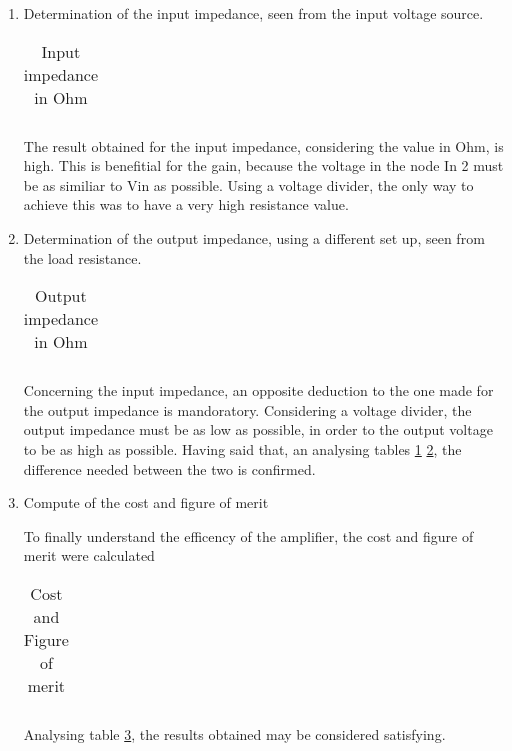 \begin{enumerate}
\begin{figure}[ht]
\begin{subfigure}{.5\textwidth}
\end{subfigure}
\end{figure}



\item Determination of the input impedance, seen from the input voltage source.

\begin{table}[h]
  \centering
  \begin{tabular}{|l|r|}
    \hline    
   
   \end{tabular}
  \caption{Input impedance in Ohm}
    \label{tab:ZI}
\end{table}

\par The result obtained for the input impedance, considering the value in Ohm, is high. This is benefitial for the gain, because the voltage in the node In 2 must be as similiar to Vin as possible. Using a voltage divider, the only way to achieve this was to have a very high resistance value.

\item Determination of the output impedance, using a different set up, seen from the load resistance. 

\begin{table}[h]
  \centering
  \begin{tabular}{|l|r|}
    \hline    
   
   \end{tabular}
  \caption{Output impedance in Ohm}
  
  \label{tab:ZO}
\end{table}


Concerning the input impedance, an opposite deduction to the one made for the output impedance is mandoratory. Considering a voltage divider, the output impedance must be as low as possible, in order to the output voltage to be as high as possible. Having said that, an analysing tables \ref{tab:ZI} \ref{tab:ZO}, the difference needed between the two is confirmed. 

\item Compute of the cost and figure of merit
\par To finally understand the efficency of the amplifier, the cost and figure of merit were calculated

\begin{table}[ht]
  \centering
  \begin{tabular}{|l|r|}
    \hline    
   
   \end{tabular}
  \caption{Cost and Figure of merit}
  \label{tab:cost}
\end{table}

Analysing table \ref{tab:cost}, the results obtained may be considered satisfying.


\end{enumerate}



